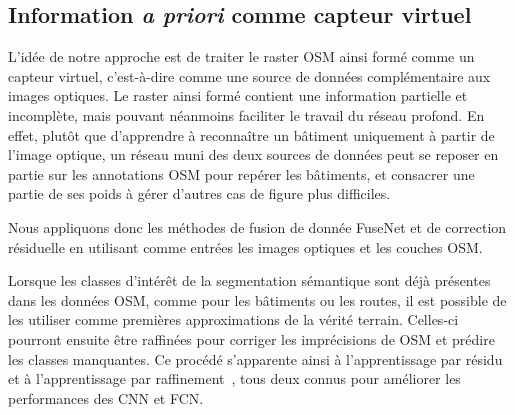 \subsection{Information \textit{a priori} comme capteur virtuel}

L'idée de notre approche est de traiter le raster \gls{OSM} ainsi formé comme un capteur virtuel, c'est-à-dire comme une source de données complémentaire aux images optiques. Le raster ainsi formé contient une information partielle et incomplète, mais pouvant néanmoins faciliter le travail du réseau profond. En effet, plutôt que d'apprendre à reconnaître un bâtiment uniquement à partir de l'image optique, un réseau muni des deux sources de données peut se reposer en partie sur les annotations \gls{OSM} pour repérer les bâtiments, et consacrer une partie de ses poids à gérer d'autres cas de figure plus difficiles.

Nous appliquons donc les méthodes de fusion de donnée FuseNet et de correction résiduelle en utilisant comme entrées les images optiques et les couches \gls{OSM}.

Lorsque les classes d'intérêt de la segmentation sémantique sont déjà présentes dans les données OSM, comme pour les bâtiments ou les routes, il est possible de les utiliser comme premières approximations de la vérité terrain. Celles-ci pourront ensuite être raffinées pour corriger les imprécisions de OSM et prédire les classes manquantes. Ce procédé s'apparente ainsi à l'apprentissage par résidu~\cite{he_deep_2016} et à l'apprentissage par raffinement~\cite{lin_refinenet_2016}, tous deux connus pour améliorer les performances des CNN et FCN.


